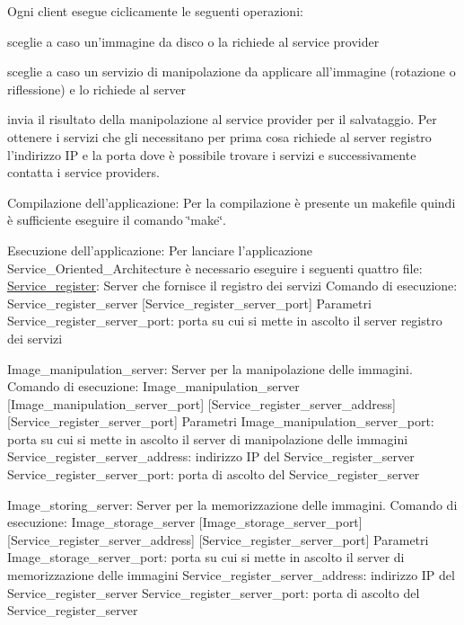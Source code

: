 Ogni client esegue ciclicamente le seguenti operazioni\-:
\begin{DoxyItemize}
\item sceglie a caso un'immagine da disco o la richiede al service provider
\item sceglie a caso un servizio di manipolazione da applicare all'immagine (rotazione o riflessione) e lo richiede al server
\item invia il risultato della manipolazione al service provider per il salvataggio. Per ottenere i servizi che gli necessitano per prima cosa richiede al server registro l'indirizzo I\-P e la porta dove è possibile trovare i servizi e successivamente contatta i service providers.
\end{DoxyItemize}

Compilazione dell'applicazione\-: Per la compilazione è presente un makefile quindi è sufficiente eseguire il comando \char`\"{}make\char`\"{}.

Esecuzione dell'applicazione\-: Per lanciare l'applicazione Service\-\_\-\-Oriented\-\_\-\-Architecture è necessario eseguire i seguenti quattro file\-: \hyperlink{class_service__register}{Service\-\_\-register}\-: Server che fornisce il registro dei servizi Comando di esecuzione\-: Service\-\_\-register\-\_\-server \mbox{[}Service\-\_\-register\-\_\-server\-\_\-port\mbox{]} Parametri Service\-\_\-register\-\_\-server\-\_\-port\-: porta su cui si mette in ascolto il server registro dei servizi

Image\-\_\-manipulation\-\_\-server\-: Server per la manipolazione delle immagini. Comando di esecuzione\-: Image\-\_\-manipulation\-\_\-server \mbox{[}Image\-\_\-manipulation\-\_\-server\-\_\-port\mbox{]} \mbox{[}Service\-\_\-register\-\_\-server\-\_\-address\mbox{]} \mbox{[}Service\-\_\-register\-\_\-server\-\_\-port\mbox{]} Parametri Image\-\_\-manipulation\-\_\-server\-\_\-port\-: porta su cui si mette in ascolto il server di manipolazione delle immagini Service\-\_\-register\-\_\-server\-\_\-address\-: indirizzo I\-P del Service\-\_\-register\-\_\-server Service\-\_\-register\-\_\-server\-\_\-port\-: porta di ascolto del Service\-\_\-register\-\_\-server

Image\-\_\-storing\-\_\-server\-: Server per la memorizzazione delle immagini. Comando di esecuzione\-: Image\-\_\-storage\-\_\-server \mbox{[}Image\-\_\-storage\-\_\-server\-\_\-port\mbox{]} \mbox{[}Service\-\_\-register\-\_\-server\-\_\-address\mbox{]} \mbox{[}Service\-\_\-register\-\_\-server\-\_\-port\mbox{]} Parametri Image\-\_\-storage\-\_\-server\-\_\-port\-: porta su cui si mette in ascolto il server di memorizzazione delle immagini Service\-\_\-register\-\_\-server\-\_\-address\-: indirizzo I\-P del Service\-\_\-register\-\_\-server Service\-\_\-register\-\_\-server\-\_\-port\-: porta di ascolto del Service\-\_\-register\-\_\-server

